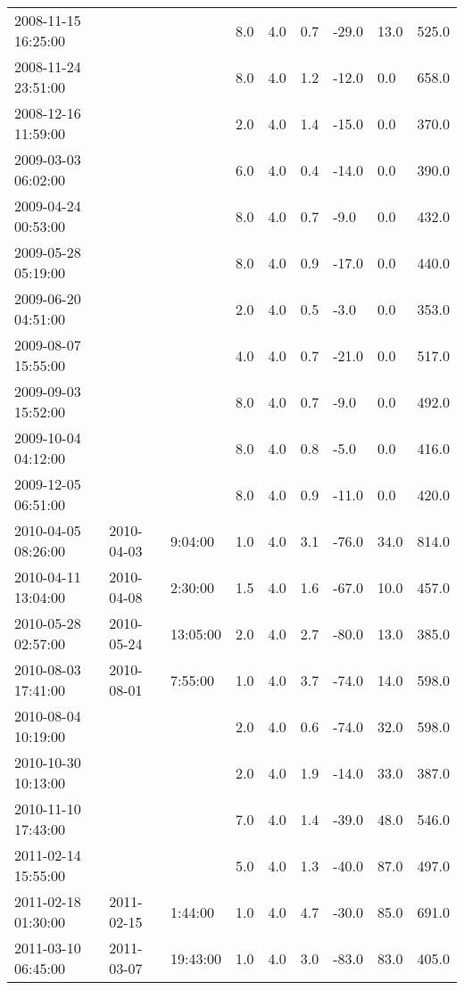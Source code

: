 \begin{longtable}{lllllllll}
        2008-11-15 16:25:00 & ~ & ~ & 8.0 & 4.0 & 0.7 & -29.0 & 13.0 & 525.0 \\ 
        2008-11-24 23:51:00 & ~ & ~ & 8.0 & 4.0 & 1.2 & -12.0 & 0.0 & 658.0 \\ 
        2008-12-16 11:59:00 & ~ & ~ & 2.0 & 4.0 & 1.4 & -15.0 & 0.0 & 370.0 \\ 
        2009-03-03 06:02:00 & ~ & ~ & 6.0 & 4.0 & 0.4 & -14.0 & 0.0 & 390.0 \\ 
        2009-04-24 00:53:00 & ~ & ~ & 8.0 & 4.0 & 0.7 & -9.0 & 0.0 & 432.0 \\ 
        2009-05-28 05:19:00 & ~ & ~ & 8.0 & 4.0 & 0.9 & -17.0 & 0.0 & 440.0 \\ 
        2009-06-20 04:51:00 & ~ & ~ & 2.0 & 4.0 & 0.5 & -3.0 & 0.0 & 353.0 \\ 
        2009-08-07 15:55:00 & ~ & ~ & 4.0 & 4.0 & 0.7 & -21.0 & 0.0 & 517.0 \\ 
        2009-09-03 15:52:00 & ~ & ~ & 8.0 & 4.0 & 0.7 & -9.0 & 0.0 & 492.0 \\ 
        2009-10-04 04:12:00 & ~ & ~ & 8.0 & 4.0 & 0.8 & -5.0 & 0.0 & 416.0 \\ 
        2009-12-05 06:51:00 & ~ & ~ & 8.0 & 4.0 & 0.9 & -11.0 & 0.0 & 420.0 \\ 
        2010-04-05 08:26:00 & 2010-04-03 & 9:04:00 & 1.0 & 4.0 & 3.1 & -76.0 & 34.0 & 814.0 \\ 
        2010-04-11 13:04:00 & 2010-04-08 & 2:30:00 & 1.5 & 4.0 & 1.6 & -67.0 & 10.0 & 457.0 \\ 
        2010-05-28 02:57:00 & 2010-05-24 & 13:05:00 & 2.0 & 4.0 & 2.7 & -80.0 & 13.0 & 385.0 \\ 
        2010-08-03 17:41:00 & 2010-08-01 & 7:55:00 & 1.0 & 4.0 & 3.7 & -74.0 & 14.0 & 598.0 \\ 
        2010-08-04 10:19:00 & ~ & ~ & 2.0 & 4.0 & 0.6 & -74.0 & 32.0 & 598.0 \\ 
        2010-10-30 10:13:00 & ~ & ~ & 2.0 & 4.0 & 1.9 & -14.0 & 33.0 & 387.0 \\ 
        2010-11-10 17:43:00 & ~ & ~ & 7.0 & 4.0 & 1.4 & -39.0 & 48.0 & 546.0 \\ 
        2011-02-14 15:55:00 & ~ & ~ & 5.0 & 4.0 & 1.3 & -40.0 & 87.0 & 497.0 \\ 
        2011-02-18 01:30:00 & 2011-02-15 & 1:44:00 & 1.0 & 4.0 & 4.7 & -30.0 & 85.0 & 691.0 \\ 
        2011-03-10 06:45:00 & 2011-03-07 & 19:43:00 & 1.0 & 4.0 & 3.0 & -83.0 & 83.0 & 405.0 \\ 

\end{longtable}
